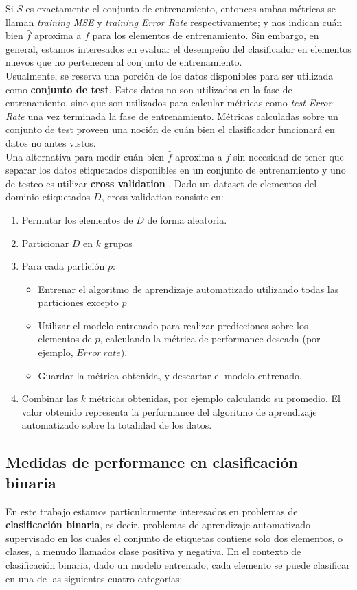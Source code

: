Si $S$ es exactamente el conjunto de entrenamiento, entonces ambas métricas se llaman \textit{training MSE} y \textit{training Error Rate} respectivamente; y nos indican cuán bien $\hat{f}$ aproxima a $f$ para los elementos de entrenamiento. Sin embargo, en general, estamos interesados en evaluar el desempeño del clasificador en elementos nuevos que no pertenecen al conjunto de entrenamiento.  \\

Usualmente, se reserva una porción de los datos disponibles para ser utilizada como \textbf{conjunto de test}. Estos datos no son utilizados en la fase de entrenamiento, sino que son utilizados para calcular métricas como \textit{test Error Rate} una vez terminada la fase de entrenamiento. Métricas calculadas sobre un conjunto de test proveen una noción de cuán bien el clasificador funcionará en datos no antes vistos. \\

Una alternativa para medir cuán bien $\hat{f}$ aproxima a $f$ sin necesidad de tener que separar los datos etiquetados disponibles en un conjunto de entrenamiento y uno de testeo es utilizar \textbf{cross validation} \cite{cross_validation}. Dado un dataset de elementos del dominio etiquetados $D$, cross validation consiste en:
\label{cross_validation}
\begin{enumerate}
\item Permutar los elementos de $D$ de forma aleatoria.
\item Particionar $D$ en $k$ grupos
\item Para cada partición $p$:
\begin{itemize}
\item Entrenar el algoritmo de aprendizaje automatizado utilizando todas las particiones excepto $p$
\item Utilizar el modelo entrenado para realizar predicciones sobre los elementos de $p$, calculando la métrica de performance deseada (por ejemplo, $Error \ rate$).
\item Guardar la métrica obtenida, y descartar el modelo entrenado.
\end{itemize}
\item Combinar las $k$ métricas obtenidas, por ejemplo calculando su promedio. El valor obtenido representa la performance del algoritmo de aprendizaje automatizado sobre la totalidad de los datos.
\end{enumerate}

\subsection{Medidas de performance en clasificación binaria}
\label{metricas_binarias}
En este trabajo estamos particularmente interesados en problemas de \textbf{clasificación binaria}, es decir, problemas de aprendizaje automatizado supervisado en los cuales el conjunto de etiquetas contiene solo dos elementos, o clases, a menudo llamados clase positiva y negativa. En el contexto de clasificación binaria, dado un modelo entrenado, cada elemento se puede clasificar en una de las siguientes cuatro categorías: \\

